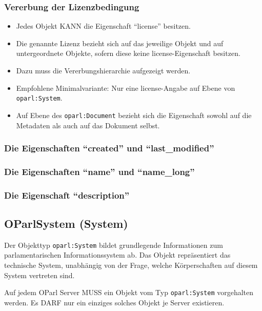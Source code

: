 \documentclass[,a4paper]{article}
\begin{document}
\subsubsection{Vererbung der Lizenzbedingung}

\begin{itemize}
\item
  Jedes Objekt KANN die Eigenschaft ``license'' besitzen.
\item
  Die genannte Lizenz bezieht sich auf das jeweilige Objekt und auf
  untergeordnete Objekte, sofern diese keine license-Eigenschaft
  besitzen.
\item
  Dazu muss die Vererbungshierarchie aufgezeigt werden.
\item
  Empfohlene Minimalvariante: Nur eine license-Angabe auf Ebene von
  \texttt{oparl:System}.
\item
  Auf Ebene des \texttt{oparl:Document} bezieht sich die Eigenschaft
  sowohl auf die Metadaten als auch auf das Dokument selbst.
\end{itemize}

\subsubsection{Die Eigenschaften ``created'' und ``last\_modified''}

\subsubsection{Die Eigenschaften ``name'' und ``name\_long''}

\subsubsection{Die Eigenschaft ``description''}

\subsection{OParlSystem (System)}

Der Objekttyp \texttt{oparl:System} bildet grundlegende Informationen
zum parlamentarischen Informationssystem ab. Das Objekt repräsentiert
das technische System, unabhängig von der Frage, welche Körperschaften
auf diesem System vertreten sind.

Auf jedem OParl Server MUSS ein Objekt vom Typ \texttt{oparl:System}
vorgehalten werden. Es DARF nur ein einziges solches Objekt je Server
existieren.
\end{document}
